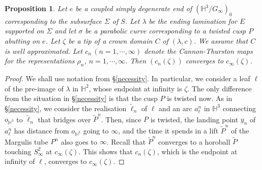 \documentclass{amsart}
\newtheorem{prop}[theorem]{Proposition}
\theoremstyle{definition}
\newcommand\HHH{{\mathbb H}}
\begin{document}
  \begin{prop}\label{twistedcusp}
 	Let $e$ be a coupled simply degenerate end of $(\HHH^3/G_\infty)_0$ corresponding to the subsurface $\Sigma$ of $S$. Let $\lambda$ be the ending lamination for $E$ supported on $\Sigma$ and  let $\sigma$ be a parabolic curve corresponding to a twisted cusp $P$ abutting on $e$. Let $\zeta$ be a tip of a crown domain $C$ of $(\lambda, c)$. We assume that $C$ is well approximated.
	Let $c_n\, (n=1, \cdots, \infty)$ denote the Cannon-Thurston maps for the representations $\rho_n$, $n=1, \cdots, \infty$.
 	Then $(c_n (\zeta))$ converges to $c_\infty (\zeta)$.
 \end{prop}
\begin{proof}
We shall use  notation from \S \ref{necessity}.
In particular, we consider a leaf $\ell$ of the pre-image of $\lambda$ in $\HHH^2$, whose endpoint at infinity is $\zeta$.
The only difference from the situation in \S \ref{necessity} is that the cusp $P$ is twisted now.
As in \S \ref{necessity}, we consider the realisation $\tilde \ell_n$ of $\ell$  and an arc $a^n_\ell$ in $\HHH^3$ connecting $o_{\HHH^3}$ to $\tilde \ell_n$ that bridges over $\widetilde P^n$.
Then, since $P$ is twisted, the landing point $y_n$ of $a^n_\ell$ has distance from $o_{\HHH^3}$ going to $\infty$, and the time  it spends in a lift $\widetilde P^n$ of the Margulis tube $P^n$ also goes to $\infty$.
Recall that $\widetilde P^n$ converges to a horoball $\widetilde P$ touching  $S^2_\infty$ at $c_\infty(\zeta)$.
This shows that $c_n(\zeta)$, which is  the endpoint at infinity of $\ell$, converges to $c_\infty(\zeta)$.
%
\end{proof}
\end{document}
